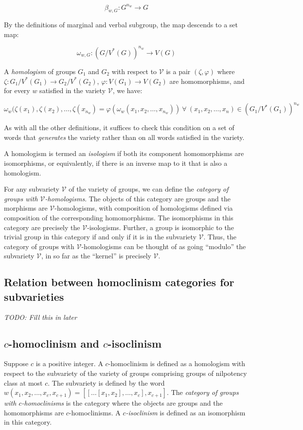 \documentclass{ucetd}
\begin{document}
$$\beta_{w,G}: G^{n_w} \to G$$

By the definitions of marginal and verbal subgroup, the map descends to a set map:

$$\omega_{w,G}: (G/V^*(G))^{n_w} \to V(G)$$

A {\em homologism} of groups $G_1$ and $G_2$ with respect to $\mathcal{V}$ is a pair $(\zeta,\varphi)$ where $\zeta: G_1/V^*(G_1) \to G_2/V^*(G_2)$, $\varphi: V(G_1) \to V(G_2)$ are homomorphisms, and for every $w$ satisfied in the variety $\mathcal{V}$, we have:

$$\omega_w(\zeta(x_1), \zeta(x_2), \dots, \zeta(x_{n_w}) = \varphi(\omega_w(x_1,x_2,\dots, x_{n_w})) \ \forall \ (x_1,x_2,\dots,x_n) \in (G_1/V^*(G_1))^{n_w}$$

As with all the other definitions, it suffices to check this condition
on a set of words that {\em generates} the variety rather than on all
words satisfied in the variety.

A homologism is termed an {\em isologism} if both its component
homomorphisms are isomorphisms, or equivalently, if there is an
inverse map to it that is also a homologism.

For any subvariety $\mathcal{V}$ of the variety of groups, we can
define the {\em category of groups with
  $\mathcal{V}$-homologisms}. The objects of this category are groups
and the morphisms are $\mathcal{V}$-homologisms, with composition of
homologisms defined via composition of the corresponding
homomorphisms. The isomorphisms in this category are precisely the
$\mathcal{V}$-isologisms. Further, a group is isomorphic to the
trivial group in this category if and only if it is in the subvariety
$\mathcal{V}$. Thus, the category of groups with
$\mathcal{V}$-homologisms can be thought of as going ``modulo'' the
subvariety $\mathcal{V}$, in so far as the ``kernel'' is precisely
$\mathcal{V}$.

\subsection{Relation between homoclinism categories for subvarieties}

{\em TODO: Fill this in later}

\subsection{$c$-homoclinism and $c$-isoclinism}

Suppose $c$ is a positive integer. A $c$-homoclinism is defined as a
homologism with respect to the subvariety of the variety of groups
comprising groups of nilpotency class at most $c$. The subvariety is
defined by the word $w(x_1,x_2,\dots,x_c,x_{c+1}) = [[ \dots
    [x_1,x_2],\dots,x_c],x_{c+1}]$. The {\em category of groups with
  $c$-homoclinisms} is the category where the objects are groups and
the homomorphisms are $c$-homoclinisms. A {\em $c$-isoclinism} is
defined as an isomorphism in this category.
\end{document}
